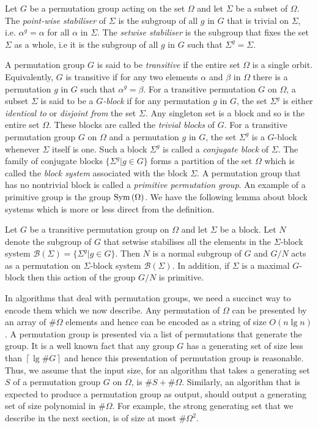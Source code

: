 \documentclass{article}
\begin{document}
Let $G$ be a permutation group acting on the set $\Omega$ and let
$\Sigma$ be a subset of $\Omega$. The \emph{point-wise stabiliser} of
$\Sigma$ is the subgroup of all $g$ in $G$ that is trivial on
$\Sigma$, i.e. $\alpha^g = \alpha$ for all $\alpha$ in $\Sigma$. The
\emph{setwise stabiliser} is the subgroup that fixes the set $\Sigma$
as a whole, i.e it is the subgroup of all $g$ in $G$ such that
$\Sigma^g = \Sigma$.

A permutation group $G$ is said to be \emph{transitive} if the entire
set $\Omega$ is a single orbit. Equivalently, $G$ is transitive if for
any two elements $\alpha$ and $\beta$ in $\Omega$ there is a
permutation $g$ in $G$ such that $\alpha^g = \beta$. For a transitive
permutation $G$ on $\Omega$, a subset $\Sigma$ is said to be a
\emph{$G$-block} if for any permutation $g$ in $G$, the set $\Sigma^g$
is either \emph{identical to} or \emph{disjoint from} the set
$\Sigma$. Any singleton set is a block and so is the entire set
$\Omega$. These blocks are called the \emph{trivial blocks} of $G$.
For a transitive permutation group $G$ on $\Omega$ and a permutation
$g$ in $G$, the set $\Sigma^g$ is a $G$-block whenever $\Sigma$ itself
is one.  Such a block $\Sigma^g$ is called a \emph{conjugate block} of
$\Sigma$. The family of conjugate blocks $\{ \Sigma^g | g \in G\}$
forms a partition of the set $\Omega$ which is called the \emph{block
  system} associated with the block $\Sigma$.  A permutation group
that has no nontrivial block is called a \emph{primitive permutation
  group}. An example of a primitive group is the group
$\mathrm{Sym}\left(\Omega\right)$. We have the following lemma about block systems which
is more or less direct from the definition.

\begin{lemma}\label{lem-block-g-action}
  Let $G$ be a transitive permutation group on $\Omega$ and let
  $\Sigma$ be a block. Let $N$ denote the subgroup of $G$ that setwise
  stabilises all the elements in the $\Sigma$-block system
  $\mathcal{B}(\Sigma) = \{\Sigma^g| g \in G \}$. Then $N$ is a normal
  subgroup of $G$ and $G/N$ acts as a permutation on $\Sigma$-block
  system $\mathcal{B}(\Sigma)$. In addition, if $\Sigma$ is a maximal
  $G$-block then this action of the group $G/N$ is primitive.
\end{lemma}

In algorithms that deal with permutation groups, we need a succinct
way to encode them which we now describe. Any permutation of $\Omega$
can be presented by an array of $\# \Omega$ elements and hence can be
encoded as a string of size $O(n \lg {n})$. A permutation group is
presented via a list of permutations that generate the group. It is a
well known fact that any group $G$ has a generating set of size less
than $\left\lceil\lg{\#G}\right\rceil$ and hence this presentation of
permutation group is reasonable. Thus, we assume that the input size,
for an algorithm that takes a generating set $S$ of a permutation
group $G$ on $\Omega$, is $\#S + \# \Omega$. Similarly, an algorithm
that is expected to produce a permutation group as output, should
output a generating set of size polynomial in $\# \Omega$. For
example, the strong generating set that we describe in the next
section, is of size at most $\# \Omega^2$.
\end{document}
